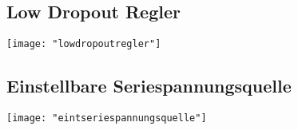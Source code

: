 \subsection{Low Dropout Regler}
\begin{minipage}[t]{0.3\textwidth}
	\vspace{0pt}								%
	\texttt{[image: "lowdropoutregler"]}
\end{minipage}\hspace{0.05\textwidth}
\begin{minipage}[t]{0.65\textwidth}
	\vspace{0pt}								%
	
\end{minipage}
\vspace{2mm}


\subsection{Einstellbare Seriespannungsquelle}
\begin{minipage}[t]{0.3\textwidth}
	\vspace{0pt}								%
	\texttt{[image: "eintseriespannungsquelle"]}
\end{minipage}\hspace{0.05\textwidth}
\begin{minipage}[t]{0.65\textwidth}
	\vspace{0pt}								%
	
\end{minipage}
\vspace{2mm}